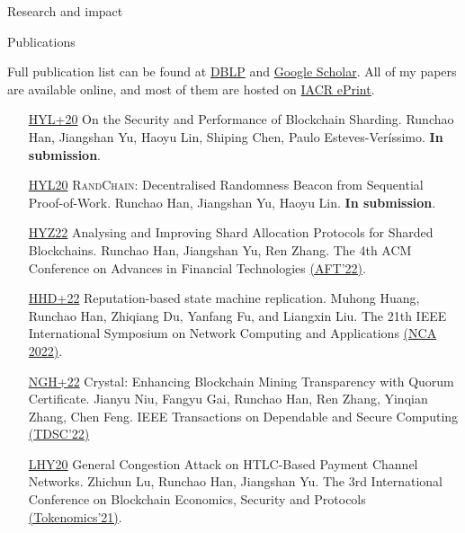 \documentclass{resume} %
\begin{document}
\begin{rSection}{Research and impact}
\end{rSection}



\begin{rSection}{Publications}

    Full publication list can be found at \href{https://dblp.org/pers/hd/h/Han:Runchao}{DBLP} and \href{http://scholar.google.com/citations?user=xbpDocQAAAAJ&hl=en}{Google Scholar}.
    All of my papers are available online, and most of them are hosted on \href{https://eprint.iacr.org/}{IACR ePrint}.

    \begin{itemize}
        \item[\href{https://eprint.iacr.org/2020/1033}{HYL+20}] On the Security and Performance of Blockchain Sharding. Runchao Han, Jiangshan Yu, Haoyu Lin, Shiping Chen, Paulo Esteves-Veríssimo. \textbf{In submission}.
        \item[\href{https://eprint.iacr.org/2020/1033}{HYL20}] \textsc{RandChain}: Decentralised Randomness Beacon from Sequential Proof-of-Work. Runchao Han, Jiangshan Yu, Haoyu Lin. \textbf{In submission}.
        \item[\href{https://eprint.iacr.org/2020/943}{HYZ22}] Analysing and Improving Shard Allocation Protocols for Sharded Blockchains. Runchao Han, Jiangshan Yu, Ren Zhang. The 4th ACM Conference on Advances in Financial Technologies \href{https://aft.acm.org/aft22/index.html}{(AFT'22)}.
        \item[\href{}{HHD+22}] Reputation-based state machine replication. Muhong Huang, Runchao Han, Zhiqiang Du, Yanfang Fu, and Liangxin Liu. The 21th IEEE International Symposium on Network Computing and Applications \href{https://www.nca-ieee.org/2022/index.html}{(NCA 2022)}.
        \item[\href{https://ieeexplore.ieee.org/document/9927474/}{NGH+22}] Crystal: Enhancing Blockchain Mining Transparency with Quorum Certificate. Jianyu Niu, Fangyu Gai, Runchao Han, Ren Zhang, Yinqian Zhang, Chen Feng. IEEE Transactions on Dependable and Secure Computing \href{https://ieeexplore.ieee.org/xpl/RecentIssue.jsp?punumber=8858}{(TDSC'22)}
        \item[\href{https://eprint.iacr.org/2020/456.pdf}{LHY20}] General Congestion Attack on HTLC-Based Payment Channel Networks. Zhichun Lu, Runchao Han, Jiangshan Yu. The 3rd International Conference on Blockchain Economics, Security and Protocols \href{https://drops.dagstuhl.de/opus/volltexte/2022/15899/}{(Tokenomics'21)}.

\end{itemize}
\end{rSection}
\end{document}
